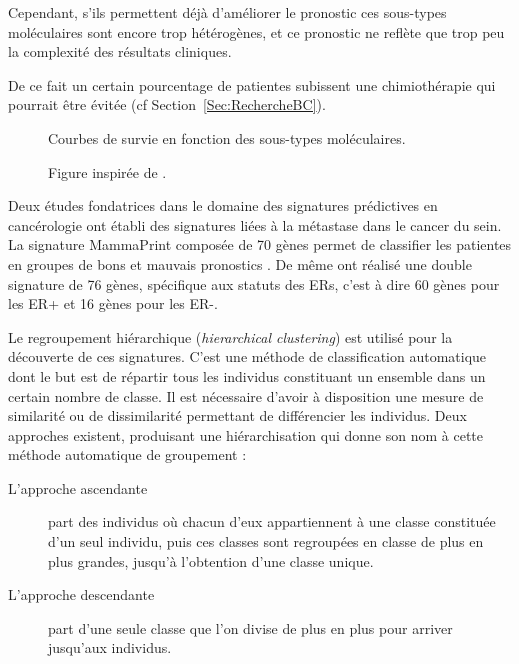 			Cependant, s'ils permettent déjà d'améliorer le pronostic ces sous-types moléculaires sont encore trop hétérogènes, et ce pronostic ne reflète que trop peu la complexité des résultats cliniques.

			De ce fait un certain pourcentage de patientes subissent une chimiothérapie qui pourrait être évitée \citep{Bertucci2002} (cf Section~\ref{Sec:RechercheBC}).

			\begin{figure}
				\centering
				\def\svgwidth{\columnwidth}
				
				\caption{Courbes de survie en fonction des sous-types moléculaires.}
				\label{fig:Subtypes-survival}
				\caption*{Figure inspirée de \citeauthor{Perou2000,Sorlie2001,Hu2006}.}
			\end{figure}

			Deux études fondatrices dans le domaine des signatures prédictives en cancérologie ont établi des signatures liées à la métastase dans le cancer du sein.
			La signature MammaPrint composée de 70 gènes permet de classifier les patientes en groupes de bons et mauvais pronostics \citep{vandevijver2002}.
			De même \citeauthor{Wang2005} ont réalisé une double signature de 76 gènes, spécifique aux statuts des \acp{ER}, c'est à dire 60 gènes pour les \acs{ER+} et 16 gènes pour les \acs{ER-}.

			Le regroupement hiérarchique (\emph{hierarchical clustering}) est utilisé pour la découverte de ces signatures.
			C'est une méthode de classification automatique dont le but est de répartir tous les individus constituant un ensemble dans un certain nombre de classe.
			Il est nécessaire d'avoir à disposition une mesure de similarité ou de dissimilarité permettant de différencier les individus.
			Deux approches existent, produisant une hiérarchisation qui donne son nom à cette méthode automatique de groupement :
			\begin{description}

				\item [L'approche ascendante]part des individus où chacun d'eux appartiennent à une classe constituée d'un seul individu, puis ces classes sont regroupées en classe de plus en plus grandes, jusqu'à l'obtention d'une classe unique.

			\pagebreak

				\item [L'approche descendante]part d'une seule classe que l'on divise de plus en plus pour arriver jusqu'aux individus.
			\end{description}

